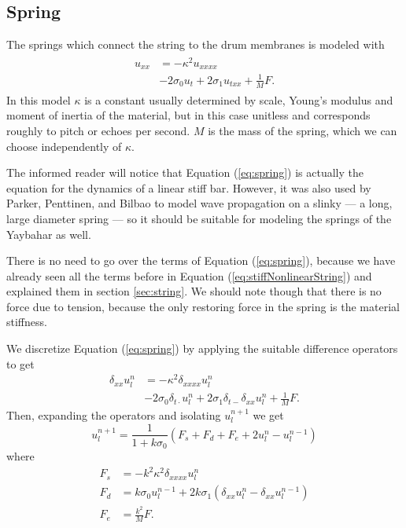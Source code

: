 \documentclass{article}
\begin{document}

\subsection{Spring}
\label{sec:spring}

The springs which connect the string to the drum membranes is modeled with
\begin{align}
  \begin{split}
  u_{xx} &= -\kappa^2 u_{xxxx} \\
  & - 2 \sigma_0 u_t + 2 \sigma_1 u_{txx} + \frac{1}{M} F.
  \end{split}
  \label{eq:spring}
\end{align}
In this model $\kappa$ is a constant usually determined by scale, Young's modulus and moment of inertia of the material, but in this case unitless and corresponds roughly to pitch or echoes per second\cite{bilbao_modular_2009}\cite{parker_modeling_2010}.
$M$ is the mass of the spring, which we can choose independently of $\kappa$.

The informed reader will notice that Equation (\ref{eq:spring}) is actually the equation for the dynamics of a linear stiff bar\cite{bilbao_modular_2009}\cite[7]{bilbao_numerical_2009}.
However, it was also used by Parker, Penttinen, and Bilbao to model wave propagation on a slinky --- a long, large diameter spring --- so it should be suitable for modeling the springs of the Yaybahar as well\cite{parker_modeling_2010}.

There is no need to go over the terms of Equation (\ref{eq:spring}), because we have already seen all the terms before in Equation (\ref{eq:stiffNonlinearString}) and explained them in section \ref{sec:string}.
We should note though that there is no force due to tension, because the only restoring force in the spring is the material stiffness.

We discretize Equation (\ref{eq:spring}) by applying the suitable difference operators to get
\begin{equation}
  \begin{split}
  \delta_{xx} u^n_l &= -\kappa^2 \delta_{xxxx} u^n_l\\
  &- 2 \sigma_0 \delta_{t\cdot} u^n_l + 2 \sigma_1 \delta_{t-} \delta_{xx}u^n_l + \frac{1}{M} F.
  \end{split}
\end{equation}
Then, expanding the operators and isolating $u^{n+1}_l$ we get
\begin{equation}
u^{n+1}_l = \frac{1}{1 + k\sigma_0} (F_s + F_d + F_e + 2u^n_l - u^{n-1}_l)
\end{equation}
where
\begin{align}
  F_s &= -k^2 \kappa^2 \delta_{xxxx} u^n_l\\
  F_d &= k\sigma_0u^{n-1}_l + 2k\sigma_1 (\delta_{xx}u^n_l - \delta_{xx}u^{n-1}_l)\\
  F_e &= \frac{k^2}{M}F.
\end{align}
\end{document}

